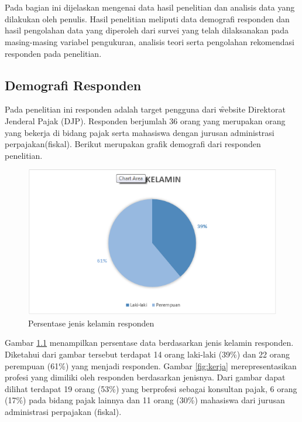 \chapter{\babEmpat}
Pada bagian ini dijelaskan mengenai data hasil penelitian dan analisis data yang dilakukan oleh penulis. Hasil penelitian meliputi data demografi responden dan hasil pengolahan data yang diperoleh dari survei yang telah dilaksanakan pada masing-masing variabel pengukuran, analisis teori serta pengolahan rekomendasi responden pada penelitian.
\section{Demografi Responden}
Pada penelitian ini responden adalah target pengguna dari \f{website} Direktorat Jenderal Pajak (DJP). Responden berjumlah 36 orang yang merupakan orang yang bekerja di bidang pajak serta mahasiswa dengan jurusan administrasi perpajakan(fiskal). Berikut merupakan grafik demografi dari responden penelitian.
\begin{figure}
	\centering
	\includegraphics[width=\textwidth]
	{pics/jenisKelamin.PNG}
	\caption{Persentase jenis kelamin responden}
	\label{fig:jeniskelamin}
\end{figure}
\noindent
Gambar \ref{fig:jeniskelamin} menampilkan persentase data berdasarkan jenis kelamin responden. Diketahui dari gambar tersebut terdapat 14 orang laki-laki (39\%) dan 22 orang perempuan (61\%) yang menjadi responden. Gambar \ref{fig:kerja} merepresentasikan profesi yang dimiliki oleh responden berdasarkan jenisnya. Dari gambar dapat dilihat terdapat 19 orang (53\%) yang berprofesi sebagai konsultan pajak, 6 orang (17\%) pada bidang pajak lainnya dan 11 orang (30\%) mahasiswa dari jurusan administrasi perpajakan (fiskal).
